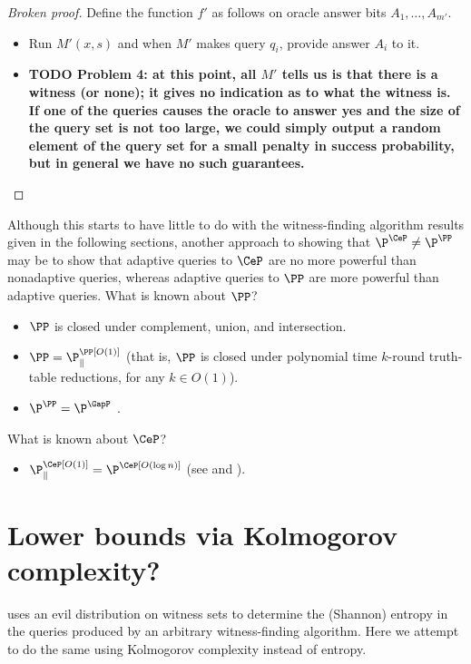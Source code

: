 \documentclass{article}
\newcommand{\todo}[1]{\textbf{TODO #1}}
\begin{document}
\begin{proof}[Broken proof]
  Define the function $f'$ as follows on oracle answer bits $A_1, \dotsc, A_{m'}$.
  \begin{itemize}
  \item Run $M'(x, s)$ and when $M'$ makes query $q_i$, provide answer $A_i$ to it.
  \item \todo{Problem 4: at this point, all $M'$ tells us is that there is a witness (or none); it gives no indication as to what the witness is.
    If one of the queries causes the oracle to answer yes and the size of the query set is not too large, we could simply output a random element of the query set for a small penalty in success probability, but in general we have no such guarantees.}\qedhere
  \end{itemize}
\end{proof}

Although this starts to have little to do with the witness-finding algorithm results given in the following sections, another approach to showing that $\P^{\CeP} \neq \P^\PP$ may be to show that adaptive queries to $\CeP$ are no more powerful than nonadaptive queries, whereas adaptive queries to $\PP$ are more powerful than adaptive queries.
What is known about $\PP$?
\begin{itemize}
\item $\PP$ is closed under complement, union, and intersection.
\item $\PP = \P^{\PP[O(1)]}_\parallel$ (that is, $\PP$ is closed under polynomial time $k$-round truth-table reductions, for any $k \in O(1)$).
\item $\P^{\PP} = \P^{\GapP}$ \autocite[Theorem~4.14]{fortnow97}.
\end{itemize}
What is known about $\CeP$?
\begin{itemize}
\item $\P^{\CeP[O(1)]}_\parallel = \P^{\CeP[O(\log n)]}$ (see \autocite[Theorem~5]{green93} and \autocite[Corollary~4.6]{ogiwara94}).
\end{itemize}

\section{Lower bounds via Kolmogorov complexity?}

\autocite{krw14} uses an evil distribution on witness sets to determine the (Shannon) entropy in the queries produced by an arbitrary witness-finding algorithm.
Here we attempt to do the same using Kolmogorov complexity instead of entropy.
\end{document}
